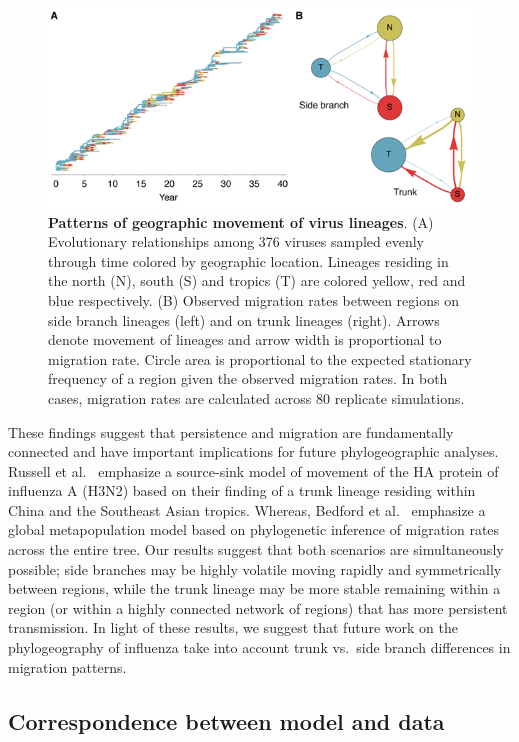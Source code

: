 \documentclass[11pt,oneside,letterpaper]{article}
\begin{document}
\begin{figure}[tb]
	\centering
	\includegraphics{figures/spatial}
	\caption{\textbf{Patterns of geographic movement of virus lineages}. (A) Evolutionary relationships among 376 viruses sampled evenly through time colored by geographic location. Lineages residing in the north (N), south (S) and tropics (T) are colored yellow, red and blue respectively. (B) Observed migration rates between regions on side branch lineages (left) and on trunk lineages (right). Arrows denote movement of lineages and arrow width is proportional to migration rate. Circle area is proportional to the expected stationary frequency of a region given the observed migration rates.  In both cases, migration rates are calculated across 80 replicate simulations.}
	\label{spatial}
\end{figure}

These findings suggest that persistence and migration are fundamentally connected and have important implications for future phylogeographic analyses.  Russell et al.\ \cite{Russell08} emphasize a source-sink model of movement of the HA protein of influenza A (H3N2) based on their finding of a trunk lineage residing within China and the Southeast Asian tropics.  Whereas, Bedford et al.\ \cite{Bedford10} emphasize a global metapopulation model based on phylogenetic inference of migration rates across the entire tree.  Our results suggest that both scenarios are simultaneously possible; side branches may be highly volatile moving rapidly and symmetrically between regions, while the trunk lineage may be more stable remaining within a region (or within a highly connected network of regions) that has more persistent transmission.  In light of these results, we suggest that future work on the phylogeography of influenza take into account trunk vs.\ side branch differences in migration patterns.

\subsection*{Correspondence between model and data}
\end{document}
